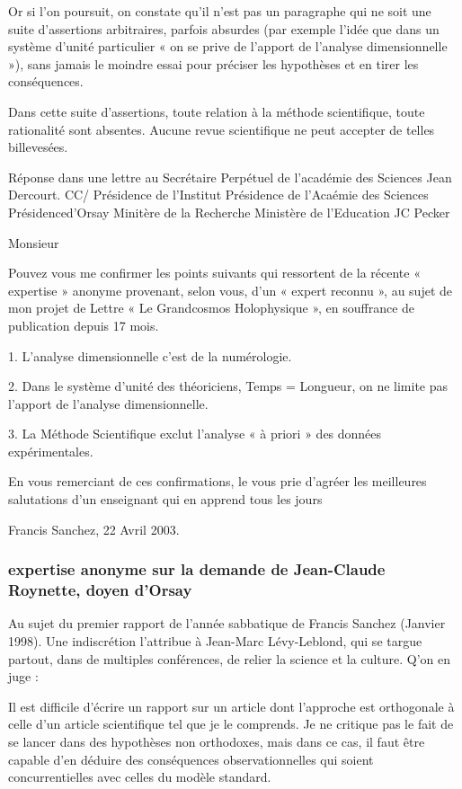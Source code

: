 \documentclass[a4paper,12pt]{article}
\begin{document}
Or si l’on poursuit, on constate qu’il n’est pas un paragraphe qui ne soit une suite d’assertions arbitraires, parfois absurdes (par exemple l’idée que dans un système d’unité particulier « on se prive de l’apport de l’analyse dimensionnelle »), sans jamais le moindre essai pour préciser les hypothèses et en tirer les conséquences.

Dans cette suite d’assertions, toute relation à la méthode scientifique, toute rationalité sont absentes. Aucune revue scientifique ne peut accepter de telles billevesées.



Réponse dans une lettre au Secrétaire Perpétuel de l’académie des Sciences Jean Dercourt.
CC/ Présidence de l’Institut
Présidence de l’Acaémie des Sciences
Présidenced’Orsay
Minitère de la Recherche
Ministère de l’Education
JC Pecker

Monsieur

Pouvez vous me confirmer les points suivants qui ressortent de la récente « expertise » anonyme provenant, selon vous, d’un « expert reconnu », au sujet de mon projet de Lettre « Le Grandcosmos Holophysique », en souffrance de publication depuis 17 mois.

1. L’analyse dimensionnelle c’est de la numérologie.

2. Dans le système d’unité des théoriciens,  Temps = Longueur, on ne limite pas l’apport de l’analyse dimensionnelle.

3. La Méthode Scientifique exclut l’analyse « à priori » des données expérimentales.

En vous remerciant de ces confirmations, le vous prie d’agréer les meilleures salutations d’un enseignant qui en apprend tous les jours

Francis Sanchez, 22 Avril 2003.


\subsubsection{expertise anonyme sur la demande de Jean-Claude Roynette, doyen d’Orsay} 

Au sujet du premier rapport de l’année sabbatique de Francis Sanchez (Janvier 1998). Une indiscrétion l’attribue à Jean-Marc Lévy-Leblond, qui se targue partout, dans de multiples conférences, de relier la science et la culture. Q’on en juge :

Il est difficile d’écrire un rapport sur un article dont l’approche est orthogonale à celle d’un article scientifique tel que je le comprends. Je ne critique pas le fait de se lancer dans des hypothèses non orthodoxes, mais dans ce cas, il faut être capable d’en déduire des conséquences observationnelles qui soient concurrentielles avec celles du modèle standard.
\end{document}
